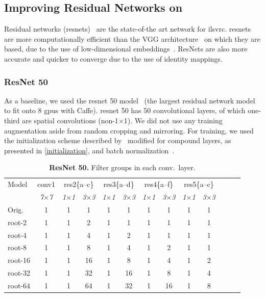 \documentclass[thesis]{subfiles}
\begin{document}
	\subsection{Improving Residual Networks on }
	Residual networks (\gls{resnet}s)~\citep{He2015} are the state-of-the art network for \gls{ilsvrc}\@. \Glspl{resnet} are more computationally efficient than the VGG architecture~\citep{Simonyan2014verydeep} on which they are based, due to the use of low-dimensional embeddings~\citep{Lin2013NiN}. ResNets are also more accurate and quicker to converge due to the use of identity mappings.
	
	\subsubsection{ResNet 50}
	\label{resnet50results}
	As a baseline, we used the \gls{resnet} 50 model~\citep{He2015} (the largest residual network model to fit onto 8 \gls{gpu}s with Caffe). \gls{resnet} 50 has 50 convolutional layers, of which one-third are spatial convolutions (non-1$\times$1). We did not use any training augmentation aside from random cropping and mirroring. 
	For training, we used the initialization scheme described by~\citep{He2015b} modified for compound layers, as presented in \cref{initialization}, and batch normalization~\citep{Ioffe2015}.
	\begin{table}[tp]
		\caption[ResNet 50 root architectures]{\textbf{ResNet 50.} Filter groups in each conv.\ layer.}
		\label{table:resnet50config}
		\centering
		\begin{tabular}{@{}lcccccccccccc@{}}
			\toprule
			Model & conv1 & \multicolumn{2}{c}{res2\{a--c\}} & \multicolumn{2}{c}{res3\{a--d\}} & \multicolumn{2}{c}{res4\{a--f\}} & \multicolumn{2}{c}{res5\{a--c\}} \\
			& \textit{\footnotesize7$\times$7} & \textit{\footnotesize1$\times$1} & \textit{\footnotesize3$\times$3} & \textit{\footnotesize1$\times$1} & \textit{\footnotesize3$\times$3} & \textit{\footnotesize1$\times$1} & \textit{\footnotesize3$\times$3} & \textit{\footnotesize1$\times$1} & \textit{\footnotesize3$\times$3} \\
			Orig. & 1 & 1 & 1 & 1 &  1 & 1 &  1 & 1 & 1 \\
			\midrule
			root-2 & 1 & 1 & 2 & 1 &  1 & 1 &  1 & 1 & 1 \\
			root-4 & 1 & 1 & 4 & 1 &  2 & 1 &  1 & 1 & 1 \\
			root-8 & 1 & 1 & 8 & 1 &  4 & 1 &  2 & 1 & 1 \\
			root-16 & 1 & 1 & 16 & 1 &  8 & 1 &  4 & 1 & 2 \\
			root-32 & 1 & 1 & 32 & 1 & 16 & 1 &  8 & 1 & 4 \\
			root-64 & 1 & 1 & 64 & 1 & 32 & 1 & 16 & 1 & 8 \\
			\bottomrule
		\end{tabular}
	\end{table}
\end{document}
